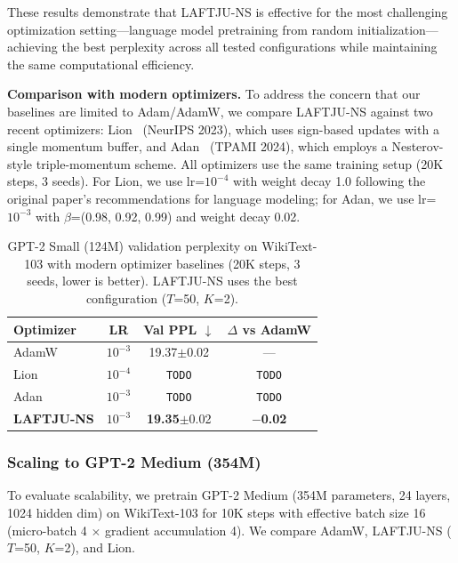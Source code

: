 \documentclass[10pt,twocolumn]{article}
\newcommand{\method}{LAFTJU}
\begin{document}
These results demonstrate that \method{}-NS is effective for the most challenging optimization setting---language model pretraining from random initialization---achieving the best perplexity across all tested configurations while maintaining the same computational efficiency.

\textbf{Comparison with modern optimizers.} To address the concern that our baselines are limited to Adam/AdamW, we compare \method{}-NS against two recent optimizers: Lion~\cite{lion} (NeurIPS 2023), which uses sign-based updates with a single momentum buffer, and Adan~\cite{adan} (TPAMI 2024), which employs a Nesterov-style triple-momentum scheme. All optimizers use the same training setup (20K steps, 3 seeds). For Lion, we use lr=$10^{-4}$ with weight decay 1.0 following the original paper's recommendations for language modeling; for Adan, we use lr=$10^{-3}$ with $\beta$=(0.98, 0.92, 0.99) and weight decay 0.02.

\begin{table}[t]
\centering
\caption{GPT-2 Small (124M) validation perplexity on WikiText-103 with modern optimizer baselines (20K steps, 3 seeds, lower is better). \method{}-NS uses the best configuration ($T$=50, $K$=2).}
\label{tab:gpt2_modern}
\small
\begin{tabular}{@{}lccc@{}}
\toprule
\textbf{Optimizer} & \textbf{LR} & \textbf{Val PPL $\downarrow$} & \textbf{$\Delta$ vs AdamW} \\
\midrule
AdamW                    & $10^{-3}$ & 19.37$\pm$0.02 & --- \\
Lion~\cite{lion}         & $10^{-4}$ & \texttt{TODO}  & \texttt{TODO} \\
Adan~\cite{adan}         & $10^{-3}$ & \texttt{TODO}  & \texttt{TODO} \\
\textbf{\method{}-NS}    & $10^{-3}$ & \textbf{19.35}$\pm$0.02 & $\mathbf{-}$\textbf{0.02} \\
\bottomrule
\end{tabular}
\end{table}

\subsubsection{Scaling to GPT-2 Medium (354M)}
\label{sec:gpt2_medium}

To evaluate scalability, we pretrain GPT-2 Medium (354M parameters, 24 layers, 1024 hidden dim) on WikiText-103 for 10K steps with effective batch size 16 (micro-batch 4 $\times$ gradient accumulation 4). We compare AdamW, \method{}-NS ($T$=50, $K$=2), and Lion.
\end{document}
